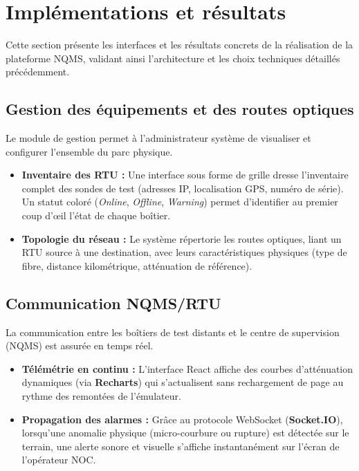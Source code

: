 \documentclass[11pt,a4paper]{article}
\begin{document}
\newpage

\section{Implémentations et résultats}

Cette section présente les interfaces et les résultats concrets de la réalisation de la plateforme NQMS, validant ainsi l'architecture et les choix techniques détaillés précédemment.

\subsection{Gestion des équipements et des routes optiques}
Le module de gestion permet à l'administrateur système de visualiser et configurer l'ensemble du parc physique. 
\begin{itemize}
    \item \textbf{Inventaire des RTU :} Une interface sous forme de grille dresse l'inventaire complet des sondes de test (adresses IP, localisation GPS, numéro de série). Un statut coloré (\textit{Online}, \textit{Offline}, \textit{Warning}) permet d'identifier au premier coup d'œil l'état de chaque boîtier.
    \item \textbf{Topologie du réseau :} Le système répertorie les routes optiques, liant un RTU source à une destination, avec leurs caractéristiques physiques (type de fibre, distance kilométrique, atténuation de référence).
\end{itemize}

\subsection{Communication NQMS/RTU}
La communication entre les boîtiers de test distants et le centre de supervision (NQMS) est assurée en temps réel.
\begin{itemize}
    \item \textbf{Télémétrie en continu :} L'interface React affiche des courbes d'atténuation dynamiques (via \textbf{Recharts}) qui s'actualisent sans rechargement de page au rythme des remontées de l'émulateur.
    \item \textbf{Propagation des alarmes :} Grâce au protocole WebSocket (\textbf{Socket.IO}), lorsqu'une anomalie physique (micro-courbure ou rupture) est détectée sur le terrain, une alerte sonore et visuelle s'affiche instantanément sur l'écran de l'opérateur NOC.
\end{itemize}
\end{document}
